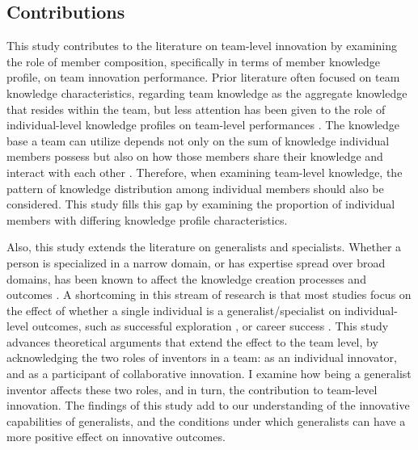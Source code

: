 \documentclass{article}
\begin{document}
\subsection{Contributions}
This study contributes to the literature on team-level innovation by examining the role of member composition, specifically in terms of member knowledge profile, on team innovation performance. Prior literature often focused on team knowledge characteristics, regarding team knowledge as the aggregate knowledge that resides within the team, but less attention has been given to the role of individual-level knowledge profiles on team-level performances \autocite{Huo2019,Harrison2007,Bercovitz2011}. The knowledge base a team can utilize depends not only on the sum of knowledge individual members possess but also on how those members share their knowledge and interact with each other \autocite{Rulke2000,Lewis2011,Ren2011}. Therefore, when examining team-level knowledge, the pattern of knowledge distribution among individual members should also be considered. This study fills this gap by examining the proportion of individual members with differing knowledge profile characteristics.

Also, this study extends the literature on generalists and specialists. Whether a person is specialized in a narrow domain, or has expertise spread over broad domains, has been known to affect the knowledge creation processes and outcomes \autocite{Melero2015,Teodoridis2019,Boh2014,Nagle2020,Rulke2000}. A shortcoming in this stream of research is that most studies focus on the effect of whether a single individual is a generalist/specialist on individual-level outcomes, such as successful exploration \autocite{Nagle2020}, or career success \autocite{Boh2014}. This study advances theoretical arguments that extend the effect to the team level, by acknowledging the two roles of inventors in a team: as an individual innovator, and as a participant of collaborative innovation. I examine how being a generalist inventor affects these two roles, and in turn, the contribution to team-level innovation. The findings of this study add to our understanding of the innovative capabilities of generalists, and the conditions under which generalists can have a more positive effect on innovative outcomes.
\end{document}

